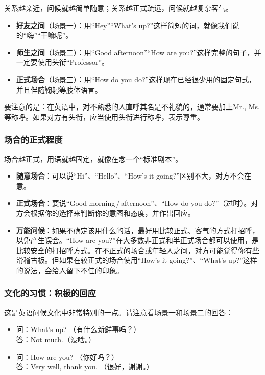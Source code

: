\documentclass[10.5pt, a4paper]{ctexbook} %
\begin{document}
关系越亲近，问候就越简单随意；关系越正式疏远，问候就越复杂客气。
\begin{itemize}
\item \textbf{好友之间}（场景一）：用“Hey”“What's up?”这样简短的词，就像我们说的“嗨”“干嘛呢”。
\item \textbf{师生之间}（场景二）：用“Good afternoon”“How are you?”这样完整的句子，并一定要使用头衔“Professor”。
\item \textbf{正式场合}（场景三）：用“How do you do?”这样现在已经很少用的固定句式，并且伴随鞠躬等肢体语言。
\end{itemize}

要注意的是：在英语中，对不熟悉的人直呼其名是不礼貌的，通常要加上Mr., Ms.等称呼。如果对方有头衔，应当使用头衔进行称呼，表示尊重。

\subsubsection*{场合的正式程度}

场合越正式，用语就越固定，就像在念一个“标准剧本”。
\begin{itemize}
\item \textbf{随意场合}：可以说“Hi”、“Hello”、“How's it going?”区别不大，对方不会在意。
\item \textbf{正式场合}：要说“Good morning\,/\,afternoon”、“How do you do?”（过时）。对方会根据你的选择来判断你的意图和态度，并作出回应。
\item \textbf{万能问候}：如果不确定该用什么的话，最好用比较正式、客气的方式打招呼，以免产生误会。“How are you?”在大多数非正式和半正式场合都可以使用，是比较安全的打招呼方式。在不正式的场合或年轻人之间，对方可能觉得你有些滑稽古板。但如果在较正式的场合使用“How's it going?”、“What's up?”这样的说法，会给人留下不佳的印象。
\end{itemize}

\subsubsection*{文化的习惯：积极的回应}

这是英语问候文化中非常特别的一点。请注意看场景一和场景二的回答：
\begin{center}
    \begin{minipage}{0.6\linewidth}
    \centering
        \begin{itemize}
            \item 问：What's up? （有什么新鲜事吗？）\\
            答：Not much.（没啥。）
            \item 问：How are you? （你好吗？）\\
            答：Very well, thank you. （很好，谢谢。）
        \end{itemize}
    \end{minipage}
\end{center}
\end{document}
